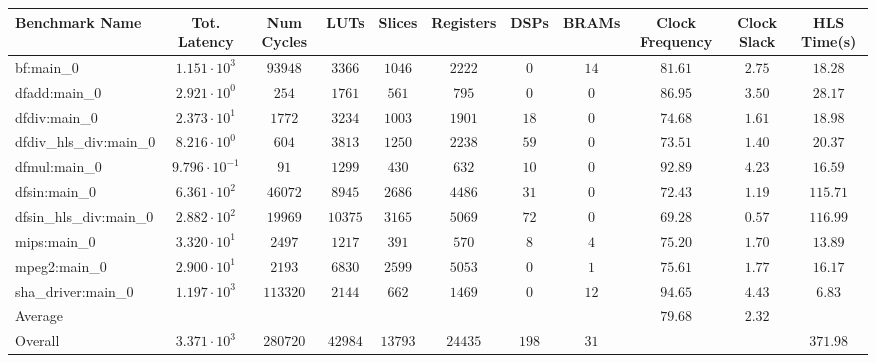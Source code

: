 \begin{tabular}{|l|c|c|c|c|c|c|c|c|c|c|}
\hline
Benchmark Name          & Tot. Latency            & Num Cycles & LUTs      & Slices    & Registers & DSPs    & BRAMs  & Clock Frequency & Clock Slack & HLS Time(s) \\
\hline
bf:main\_0              & $ 1.151 \cdot 10^{3}  $ & $ 93948  $ & $ 3366  $ & $ 1046  $ & $ 2222  $ & $ 0   $ & $ 14 $ & $ 81.61       $ & $ 2.75    $ & $ 18.28   $ \\
dfadd:main\_0           & $ 2.921 \cdot 10^{0}  $ & $ 254    $ & $ 1761  $ & $ 561   $ & $ 795   $ & $ 0   $ & $ 0  $ & $ 86.95       $ & $ 3.50    $ & $ 28.17   $ \\
dfdiv:main\_0           & $ 2.373 \cdot 10^{1}  $ & $ 1772   $ & $ 3234  $ & $ 1003  $ & $ 1901  $ & $ 18  $ & $ 0  $ & $ 74.68       $ & $ 1.61    $ & $ 18.98   $ \\
dfdiv\_hls\_div:main\_0 & $ 8.216 \cdot 10^{0}  $ & $ 604    $ & $ 3813  $ & $ 1250  $ & $ 2238  $ & $ 59  $ & $ 0  $ & $ 73.51       $ & $ 1.40    $ & $ 20.37   $ \\
dfmul:main\_0           & $ 9.796 \cdot 10^{-1} $ & $ 91     $ & $ 1299  $ & $ 430   $ & $ 632   $ & $ 10  $ & $ 0  $ & $ 92.89       $ & $ 4.23    $ & $ 16.59   $ \\
dfsin:main\_0           & $ 6.361 \cdot 10^{2}  $ & $ 46072  $ & $ 8945  $ & $ 2686  $ & $ 4486  $ & $ 31  $ & $ 0  $ & $ 72.43       $ & $ 1.19    $ & $ 115.71  $ \\
dfsin\_hls\_div:main\_0 & $ 2.882 \cdot 10^{2}  $ & $ 19969  $ & $ 10375 $ & $ 3165  $ & $ 5069  $ & $ 72  $ & $ 0  $ & $ 69.28       $ & $ 0.57    $ & $ 116.99  $ \\
mips:main\_0            & $ 3.320 \cdot 10^{1}  $ & $ 2497   $ & $ 1217  $ & $ 391   $ & $ 570   $ & $ 8   $ & $ 4  $ & $ 75.20       $ & $ 1.70    $ & $ 13.89   $ \\
mpeg2:main\_0           & $ 2.900 \cdot 10^{1}  $ & $ 2193   $ & $ 6830  $ & $ 2599  $ & $ 5053  $ & $ 0   $ & $ 1  $ & $ 75.61       $ & $ 1.77    $ & $ 16.17   $ \\
sha\_driver:main\_0     & $ 1.197 \cdot 10^{3}  $ & $ 113320 $ & $ 2144  $ & $ 662   $ & $ 1469  $ & $ 0   $ & $ 12 $ & $ 94.65       $ & $ 4.43    $ & $ 6.83    $ \\
\hline
Average                 & $                     $ & $        $ & $       $ & $       $ & $       $ & $     $ & $    $ & $ 79.68       $ & $ 2.32    $ & $         $ \\
\hline
Overall                 & $ 3.371 \cdot 10^{3}  $ & $ 280720 $ & $ 42984 $ & $ 13793 $ & $ 24435 $ & $ 198 $ & $ 31 $ & $             $ & $         $ & $ 371.98  $ \\
\hline
\end{tabular}
